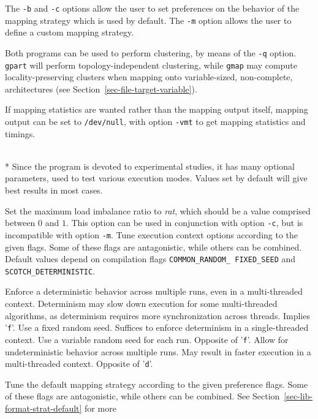 \begin{itemize}
The \texttt{-b} and \texttt{-c} options allow the user to set preferences on
the behavior of the mapping strategy which is used by default. The
\texttt{-m} option allows the user to define a custom mapping strategy.

Both programs can be used to perform clustering, by means of the
\texttt{-q} option. \texttt{gpart} will perform topology-independent
clustering, while \texttt{gmap} may compute locality-preserving clusters
when mapping onto variable-sized, non-complete, architectures (see
Section~\ref{sec-file-target-variable}).

If mapping statistics are wanted rather than the mapping output itself,
mapping output can be set to \texttt{/dev/null}, with option \texttt{-vmt}
to get mapping statistics and timings.

\progopt\\*
Since the program is devoted to experimental studies, it has many
optional parameters, used to test various execution modes. Values
set by default will give best results in most cases.
\begin{itemize}
Set the maximum load imbalance ratio to \textit{rat}, which should
be a value comprised between $0$ and $1$. This option can be used in
conjunction with option \texttt{-c}, but is incompatible with option
\texttt{-m}.
Tune execution context options according to the given flags. Some of
these flags are antagonistic, while others can be combined. Default
values depend on compilation flags \texttt{COMMON\_\lbt RANDOM\_\lbt
FIXED\_\lbt SEED} and \texttt{SCOTCH\_\lbt DETERMINISTIC}.
\begin{itemize}
\iteme[\texttt{d}]
Enforce a deterministic behavior across multiple runs, even in a
multi-threaded context. Determinism may slow down execution for some
multi-threaded algorithms, as determinism requires more
synchronization across threads. Implies '\texttt{f}'.
\iteme[\texttt{f}]
Use a fixed random seed. Suffices to enforce determinism in a
single-threaded context.
\iteme[\texttt{r}]
Use a variable random seed for each run. Opposite of '\texttt{f}'.
\iteme[\texttt{u}]
Allow for undeterministic behavior across multiple runs. May result in
faster execution in a multi-threaded context. Opposite of '\texttt{d}'.
\end{itemize}
Tune the default mapping strategy according to the given preference
flags. Some of these flags are antagonistic, while others can be
combined. See Section~\ref{sec-lib-format-strat-default} for more

\end{itemize}
\end{itemize}
